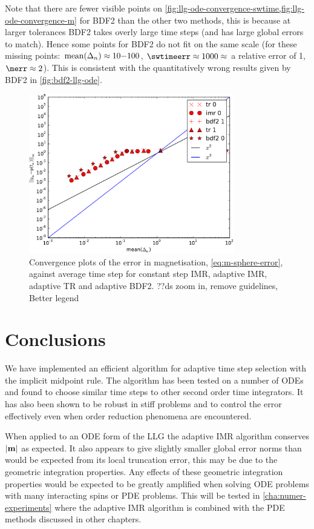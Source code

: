 Note that there are fewer visible points on \cref{fig:llg-ode-convergence-swtime,fig:llg-ode-convergence-m} for BDF2 than the other two methods, this is because at larger tolerances BDF2 takes overly large time steps (and has large global errors to match).
Hence some points for BDF2 do not fit on the same scale (for these missing points: $\operatorname{mean}(\Delta_{n}) \approx 10\mathrm{-} 100$, $\swtimeerr \approx 1000 \approx$ \ie a relative error of 1, $\merr \approx 2$).
This is consistent with the quantitatively wrong results given by BDF2 in \cref{fig:bdf2-llg-ode}.

\begin{figure}
  \centering
  \includegraphics[width=0.8\textwidth]{plots/ode_llg_adaptive_convergence/maxoferrornormsvsmeanofdts}
  \caption{Convergence plots of the error in magnetisation, \cref{eq:m-sphere-error}, against average time step for constant step IMR, adaptive IMR, adaptive TR and adaptive BDF2. ??ds zoom in, remove guidelines, Better legend}
  \label{fig:llg-ode-convergence-m}
\end{figure}

\section{Conclusions}

We have implemented an efficient algorithm for adaptive time step selection with the implicit midpoint rule.
The algorithm has been tested on a number of ODEs and found to choose similar time steps to other second order time integrators.
It has also been shown to be robust in stiff problems and to control the error effectively even when order reduction phenomena are encountered.

When applied to an ODE form of the LLG the adaptive IMR algorithm conserves $\left|{\boldsymbol{\mathrm{m}}} \right|$ as expected.
It also appears to give slightly smaller global error norms than would be expected from its local truncation error, this may be due to the geometric integration properties.
Any effects of these geometric integration properties would be expected to be greatly amplified when solving ODE problems with many interacting spins or PDE problems.
This will be tested in \cref{cha:numer-experiments} where the adaptive IMR algorithm is combined with the PDE methods discussed in other chapters.

